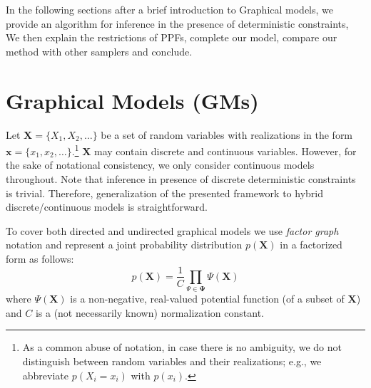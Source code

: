 \documentclass[letterpaper]{article}
\renewcommand{\vec}[1]{\mathbf{#1}}
\newcommand{\pr}{p}
\begin{document}
In the following sections after a brief introduction to Graphical models, 
we provide an algorithm for inference in the presence of deterministic constraints,
We then explain the restrictions of PPFs, complete our model, compare our method with other samplers and conclude. 

\section{Graphical Models (GMs)}
Let $\vec{X} = \{X_1, X_2, \ldots\}$ be a set of random variables with realizations in the form 
$\vec{x} = \{x_1, x_2, \ldots\}$.\footnote{
As a common abuse of notation, in case there is no ambiguity, we do not distinguish between random variables and their realizations; e.g., we abbreviate $\pr(X_i = x_i)$ with $\pr(x_i)$.}
$\vec{X}$ may contain discrete and continuous variables. 
However, for the sake of notational consistency, %
we only consider continuous models throughout. 
Note that inference in presence of discrete deterministic constraints is trivial.
Therefore, generalization of the presented framework to hybrid discrete/continuous models is straightforward.   

To cover both directed and undirected graphical models we use
\emph{factor graph} notation \cite{kschischang2001factor}
and represent a joint probability distribution $\pr(\vec{X})$ in a factorized form as follows: 
\begin{equation}
\label{e:factor-graph}
\pr(\vec{X}) = \frac{1}{C} \prod_{\Psi \in \boldsymbol\Psi} \Psi (\vec{X})
\end{equation}
where 
$\Psi(\vec{X})$ is a non-negative, real-valued potential function (of a subset of $\vec{X}$) and $C$ is a (not necessarily known) normalization constant.
\end{document}

